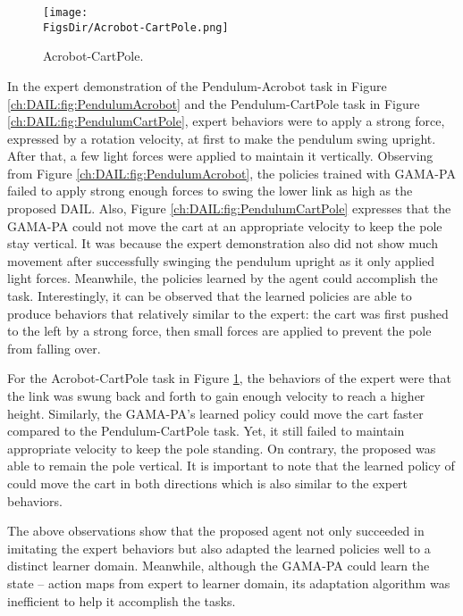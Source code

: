 \begin{landscape}
  \begin{figure}[htbp!]
    \centering
    \texttt{[image: \\FigsDir/Acrobot-CartPole.png]}
    \caption{Acrobot-CartPole.}
    \label{ch:DAIL:fig:AcrobotCartPole}
  \end{figure}
\end{landscape}

In the expert demonstration of the Pendulum-Acrobot task in Figure \ref{ch:DAIL:fig:PendulumAcrobot} and the Pendulum-CartPole task in Figure \ref{ch:DAIL:fig:PendulumCartPole}, expert behaviors were to apply a strong force, expressed by a rotation velocity, at first to make the pendulum swing upright.
After that, a few light forces were applied to maintain it vertically.
Observing from Figure \ref{ch:DAIL:fig:PendulumAcrobot}, the policies trained with GAMA-PA \cite{DAIL_Model_DAIL} failed to apply strong enough forces to swing the lower link as high as the proposed DAIL.
Also, Figure \ref{ch:DAIL:fig:PendulumCartPole} expresses that the GAMA-PA \cite{DAIL_Model_DAIL} could not move the cart at an appropriate velocity to keep the pole stay vertical.
It was because the expert demonstration also did not show much movement after successfully swinging the pendulum upright as it only applied light forces.
Meanwhile, the policies learned by the \DAIL{} agent could accomplish the task.
Interestingly, it can be observed that the learned policies are able to produce behaviors that relatively similar to the expert: the cart was first pushed to the left by a strong force, then small forces are applied to prevent the pole from falling over.

For the Acrobot-CartPole task in Figure \ref{ch:DAIL:fig:AcrobotCartPole}, the behaviors of the expert were that the link was swung back and forth to gain enough velocity to reach a higher height.
Similarly, the GAMA-PA's learned policy could move the cart faster compared to the Pendulum-CartPole task.
Yet, it still failed to maintain appropriate velocity to keep the pole standing.
On contrary, the proposed \DAIL{} was able to remain the pole vertical.
It is important to note that the learned policy of \DAIL{} could move the cart in both directions which is also similar to the expert behaviors.

The above observations show that the proposed \DAIL{} agent not only succeeded in imitating the expert behaviors but also adapted the learned policies well to a distinct learner domain.
Meanwhile, although the GAMA-PA \cite{DAIL_Model_DAIL} could learn the state -- action maps from expert to learner domain, its adaptation algorithm was inefficient to help it accomplish the tasks.
